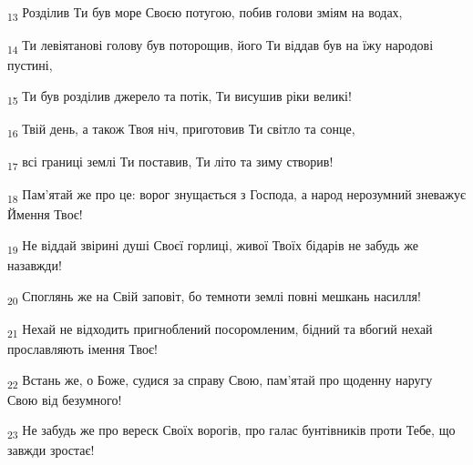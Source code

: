\begin{tcolorbox}
\textsubscript{13} Розділив Ти був море Своєю потугою, побив голови зміям на водах,
\end{tcolorbox}
\begin{tcolorbox}
\textsubscript{14} Ти левіятанові голову був поторощив, його Ти віддав був на їжу народові пустині,
\end{tcolorbox}
\begin{tcolorbox}
\textsubscript{15} Ти був розділив джерело та потік, Ти висушив ріки великі!
\end{tcolorbox}
\begin{tcolorbox}
\textsubscript{16} Твій день, а також Твоя ніч, приготовив Ти світло та сонце,
\end{tcolorbox}
\begin{tcolorbox}
\textsubscript{17} всі границі землі Ти поставив, Ти літо та зиму створив!
\end{tcolorbox}
\begin{tcolorbox}
\textsubscript{18} Пам'ятай же про це: ворог знущається з Господа, а народ нерозумний зневажує Ймення Твоє!
\end{tcolorbox}
\begin{tcolorbox}
\textsubscript{19} Не віддай звірині душі Своєї горлиці, живої Твоїх бідарів не забудь же назавжди!
\end{tcolorbox}
\begin{tcolorbox}
\textsubscript{20} Споглянь же на Свій заповіт, бо темноти землі повні мешкань насилля!
\end{tcolorbox}
\begin{tcolorbox}
\textsubscript{21} Нехай не відходить пригноблений посоромленим, бідний та вбогий нехай прославляють імення Твоє!
\end{tcolorbox}
\begin{tcolorbox}
\textsubscript{22} Встань же, о Боже, судися за справу Свою, пам'ятай про щоденну наругу Свою від безумного!
\end{tcolorbox}
\begin{tcolorbox}
\textsubscript{23} Не забудь же про вереск Своїх ворогів, про галас бунтівників проти Тебе, що завжди зростає!
\end{tcolorbox}
